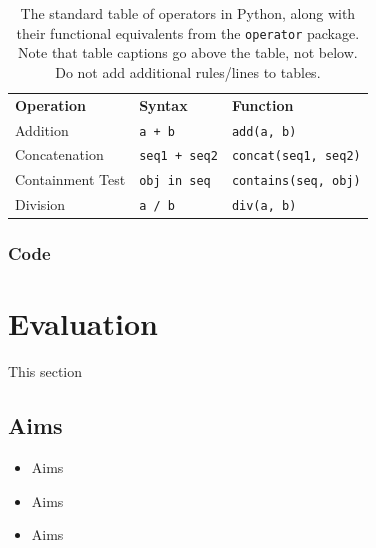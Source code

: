 \documentclass{l4proj}
\begin{document}
\begin{table}[]
    \caption{The standard table of operators in Python, along with their functional equivalents from the \texttt{operator} package. Note that table
    captions go above the table, not below. Do not add additional rules/lines to tables. }\label{tab:operators}
    \begin{tabular}{@{}lll@{}}
    \textbf{Operation}    & \textbf{Syntax}                & \textbf{Function}                            \\ %
    Addition              & \texttt{a + b}                          & \texttt{add(a, b)}                                    \\
    Concatenation         & \texttt{seq1 + seq2}                    & \texttt{concat(seq1, seq2)}                           \\
    Containment Test      & \texttt{obj in seq}                     & \texttt{contains(seq, obj)}                           \\
    Division              & \texttt{a / b}                          & \texttt{div(a, b) }  \\
    \end{tabular}
    \end{table}
\subsection{Code}

\chapter{Evaluation} 
This section


\section{Aims}
\begin{itemize}
    \item Aims
    \item Aims
    \item Aims
\end{itemize}
\end{document}

